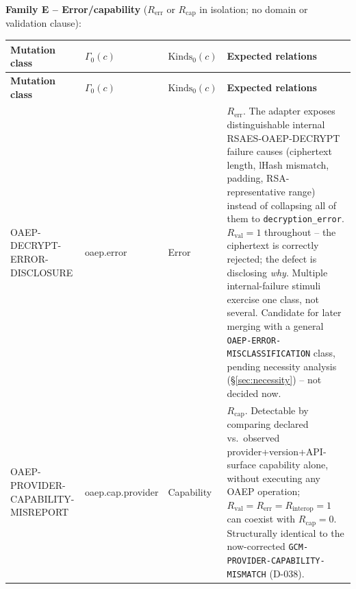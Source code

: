 \documentclass[11pt,a4paper]{article}
\begin{document}
\textbf{Family E -- Error/capability} ($R_{\text{err}}$ or $R_{\text{cap}}$ in isolation; no domain or validation clause):
\begin{longtable}{p{}p{}p{}p{}}
\toprule
\textbf{Mutation class} & \textbf{$\Gamma_0(c)$} & \textbf{$\text{Kinds}_0(c)$} & \textbf{Expected relations}\\
\midrule\endfirsthead
\toprule
\textbf{Mutation class} & \textbf{$\Gamma_0(c)$} & \textbf{$\text{Kinds}_0(c)$} & \textbf{Expected relations}\\
\midrule\endhead
OAEP-DECRYPT-ERROR-DISCLOSURE & oaep.error & Error & $R_{\text{err}}$. The adapter exposes distinguishable internal RSAES-OAEP-DECRYPT failure causes (ciphertext length, lHash mismatch, padding, RSA-representative range) instead of collapsing all of them to \texttt{decryption\_error}. $R_{\text{val}}=1$ throughout -- the ciphertext is correctly rejected; the defect is disclosing \emph{why}. Multiple internal-failure stimuli exercise one class, not several. Candidate for later merging with a general \texttt{OAEP-ERROR-MISCLASSIFICATION} class, pending necessity analysis (\S\ref{sec:necessity}) -- not decided now.\\
OAEP-PROVIDER-CAPABILITY-MISREPORT & oaep.cap.provider & Capability & $R_{\text{cap}}$. Detectable by comparing declared vs.\ observed provider+version+API-surface capability alone, without executing any OAEP operation; $R_{\text{val}}=R_{\text{err}}=R_{\text{interop}}=1$ can coexist with $R_{\text{cap}}=0$. Structurally identical to the now-corrected \texttt{GCM-PROVIDER-CAPABILITY-MISMATCH} (D-038).\\
\bottomrule
\end{longtable}
\end{document}
